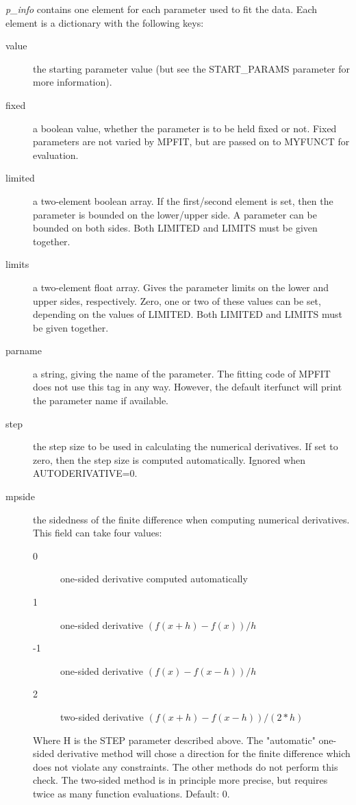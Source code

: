 \documentclass[a4paper,11pt]{scrartcl}
\begin{document}
\textit{p\_info} contains one element for each parameter used to fit the data.
Each element is a dictionary with the following keys:
\begin{description}
  \item[value] the starting parameter value (but see the START\_PARAMS parameter
for more information).
  \item[fixed] a boolean value, whether the parameter is to be held fixed or
not.  Fixed parameters are not varied by MPFIT, but are passed on to MYFUNCT for
evaluation.
  \item[limited] a two-element boolean array.  If the first/second element is
set, then the parameter is bounded on the lower/upper side.  A parameter can be
bounded on both sides.  Both LIMITED and LIMITS must be given together.
  \item[limits] a two-element float array.  Gives the parameter limits on the
lower and upper sides, respectively.  Zero, one or two of these values can be
set, depending on the values of LIMITED.  Both LIMITED and LIMITS must be given
together.
  \item[parname] a string, giving the name of the parameter.  The fitting code
of MPFIT does not use this tag in any way.  However, the default iterfunct will
print the parameter name if available.
  \item[step] the step size to be used in calculating the numerical derivatives.
 If set to zero, then the step size is	computed automatically.  Ignored when
AUTODERIVATIVE=0.
  \item[mpside] the sidedness of the finite difference when computing numerical
derivatives.  This field can take four values:\\
    \begin{description}
      \item [0]one-sided derivative computed automatically
      \item [1]one-sided derivative $(f(x+h) - f(x)  )/h$
      \item [-1] one-sided derivative $(f(x)   - f(x-h))/h$
      \item [2] two-sided derivative $(f(x+h) - f(x-h))/(2*h)$
    \end{description}
	Where H is the STEP parameter described above.  The "automatic"
one-sided derivative method will chose a direction for the finite difference
which does not 			 violate any constraints.  The other methods do
not perform this check.  The two-sided method is in principle more precise, but
requires twice as many function evaluations.  Default: 0.

\end{description}
\end{document}
